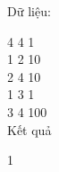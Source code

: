 Dữ liệu:  

   4 4 1   
\\   1 2 10   
\\   2 4 10   
\\   1 3 1   
\\   3 4 100   
\\

   Kết quả  

   1